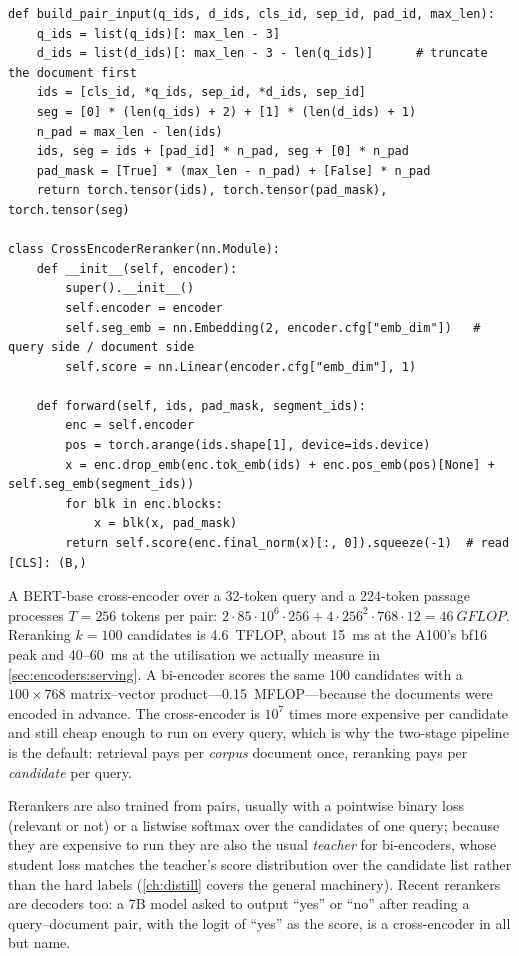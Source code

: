 \begin{lstlisting}[caption={Pair input and cross-encoder head (from \ident{llmsys/encoder.py}).},label={lst:encoders:cross-enc}]
def build_pair_input(q_ids, d_ids, cls_id, sep_id, pad_id, max_len):
    q_ids = list(q_ids)[: max_len - 3]
    d_ids = list(d_ids)[: max_len - 3 - len(q_ids)]      # truncate the document first
    ids = [cls_id, *q_ids, sep_id, *d_ids, sep_id]
    seg = [0] * (len(q_ids) + 2) + [1] * (len(d_ids) + 1)
    n_pad = max_len - len(ids)
    ids, seg = ids + [pad_id] * n_pad, seg + [0] * n_pad
    pad_mask = [True] * (max_len - n_pad) + [False] * n_pad
    return torch.tensor(ids), torch.tensor(pad_mask), torch.tensor(seg)

class CrossEncoderReranker(nn.Module):
    def __init__(self, encoder):
        super().__init__()
        self.encoder = encoder
        self.seg_emb = nn.Embedding(2, encoder.cfg["emb_dim"])   # query side / document side
        self.score = nn.Linear(encoder.cfg["emb_dim"], 1)

    def forward(self, ids, pad_mask, segment_ids):
        enc = self.encoder
        pos = torch.arange(ids.shape[1], device=ids.device)
        x = enc.drop_emb(enc.tok_emb(ids) + enc.pos_emb(pos)[None] + self.seg_emb(segment_ids))
        for blk in enc.blocks:
            x = blk(x, pad_mask)
        return self.score(enc.final_norm(x)[:, 0]).squeeze(-1)  # read [CLS]: (B,)
\end{lstlisting}

\begin{napkinmath}
A BERT-base cross-encoder over a 32-token query and a 224-token passage processes $T=256$ tokens per
pair: $2\cdot85\cdot10^6\cdot256+4\cdot256^2\cdot768\cdot12=\SI{46}{GFLOP}$. Reranking $k=100$
candidates is \SI{4.6}{TFLOP}, about \SI{15}{\milli\second} at the A100's bf16 peak and
\SI{40}{}--\SI{60}{\milli\second} at the utilisation we actually measure in \cref{sec:encoders:serving}.
A bi-encoder scores the same 100 candidates with a $100\times768$ matrix--vector product---\SI{0.15}{MFLOP}---because
the documents were encoded in advance. The cross-encoder is $10^7$ times more expensive per
candidate and still cheap enough to run on every query, which is why the two-stage pipeline is the
default: retrieval pays per \emph{corpus} document once, reranking pays per \emph{candidate} per
query.
\end{napkinmath}

Rerankers are also trained from pairs, usually with a pointwise binary loss (relevant or not) or a
listwise softmax over the candidates of one query; because they are expensive to run they are
also the usual \emph{teacher} for bi-encoders, whose student loss matches the teacher's score
distribution over the candidate list rather than the hard labels (\cref{ch:distill} covers the general
machinery). Recent rerankers are decoders too: a 7B model asked to output ``yes'' or ``no'' after
reading a query--document pair, with the logit of ``yes'' as the score, is a cross-encoder in all but
name.

